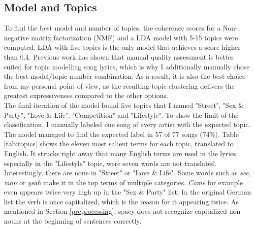 \documentclass[conference]{IEEEtran}
\begin{document}
\subsection{Model and Topics}
To find the best model and number of topics, the coherence scores for a Non-negative matrix factorization (NMF) and a LDA model with 5-15 topics were computed. LDA with five topics is the only model that achieves a score higher than 0.4. Previous work has shown \cite{sterckx} that manual quality assessment is better suited for topic modelling song lyrics, which is why I additionally manually chose the best model/topic number combination. As a result, it is also the best choice from my personal point of view, as the resulting topic clustering delivers the greatest expressiveness compared to the other options.\\
The final iteration of the model found five topics that I named "Street", "Sex \& Party", "Love \& Life", "Competition" and "Lifestyle". To show the limit of the classification, I manually labeled one song of every artist with the expected topic. The model managed to find the expected label in 57 of 77 songs (74\%). Table \ref{tab:topics} shows the eleven most salient terms for each topic, translated to English. It strucks right away that many English terms are used in the lyrics, especially in the "Lifestyle" topic, were seven words are not translated. Interestingly, there are none in "Street" or "Love \& Life". Some words such as \textit{see}, \textit{man} or \textit{yeah} make it in the top terms of multiple categories. \textit{Come} for example even appears twice very high up in the "Sex \& Party" list. In the original German list the verb is once capitalized, which is the reason for it appearing twice. As mentioned in Section \ref{preprocessing}, spacy does not recognize capitalized non-nouns at the beginning of sentences correctly.
\end{document}

